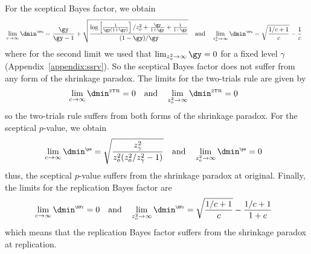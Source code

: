 \begin{subappendices}
For the sceptical Bayes factor, we obtain
\begin{align*}
  &\lim_{c \to \infty} \dmin^{\scriptscriptstyle \BFs} =
  \frac{\gy}{\gy - 1} +
    \sqrt{\frac{\log\left[\frac{1}{\gy(1 + \gy)}\right]/z_{o}^{2}
    + \frac{\gy}{1 + \gy} + \frac{1}{1 - \gy}}{(1 - \gy)/\gy}}&
  &\text{and}&
  &\lim_{z_{o}^{2}\to \infty} \dmin^{\scriptscriptstyle \BFs} =
    \sqrt{\frac{1/c + 1}{c}} - \frac{1}{c}&
\end{align*}
where for the second limit we used that $\lim_{z_{o}^{2} \to \infty} \gy = 0$
for a fixed level $\gamma$ (Appendix~\ref{appendix:ssrv}). So the sceptical
Bayes factor does not suffer from any form of the shrinkage paradox. The limits
for the two-trials rule are given by
\begin{align*}
  &\lim_{c \to \infty} \dmin^{\scriptscriptstyle \text{2TR}} = 0&
  &\text{and}&
  &\lim_{z_{o}^{2}\to \infty} \dmin^{\scriptscriptstyle \text{2TR}} = 0&
\end{align*}
so the two-trials rule suffers from both forms of the shrinkage paradox. For the
sceptical $p$-value, we obtain
\begin{align*}
  &\lim_{c \to \infty} \dmin^{\scriptscriptstyle \ps} =
    \sqrt{\frac{z_{\gamma}^{2}}{z_{o}^{2}(z_{o}^{2}/z_{\gamma}^{2} - 1)}}&
  &\text{and}&
  &\lim_{z_{o}^{2}\to \infty} \dmin^{\scriptscriptstyle \ps} = 0&
\end{align*}
thus, the sceptical $p$-value suffers from the shrinkage paradox at original.
Finally, the limits for the replication Bayes factor are
\begin{align*}
  &\lim_{c \to \infty} \dmin^{\scriptscriptstyle \BFr} = 0 &
  &\text{and}&
  &\lim_{z_{o}^{2}\to \infty} \dmin^{\scriptscriptstyle \BFr} =
    \sqrt{\frac{1/c + 1}{c}} - \frac{1/c + 1}{1 + c}&
\end{align*}
which means that the replication Bayes factor suffers from the shrinkage paradox
at replication.



\end{subappendices}
